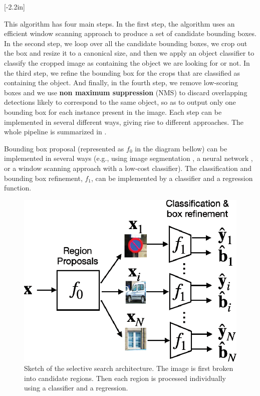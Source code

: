 [-2.2in]

This algorithm has four main steps. In the first step, the algorithm uses an efficient window scanning approach to produce a set of candidate bounding boxes. In the second step, we loop over all the candidate bounding boxes, we crop out the box and resize it to a canonical size, and then we apply an object classifier to classify the cropped image as containing the object we are looking for or not. In the third step, we refine the bounding box for the crops that are classified as containing the object. And finally, in the fourth step, we remove low-scoring boxes and we use {\bf non maximum suppression} (NMS) to discard overlapping detections likely to correspond to the same object, so as to output only one bounding box for each instance present in the image. Each step can be implemented in several different ways, giving rise to different approaches. The whole pipeline is summarized in \fig{\ref{fig:selective_search_pipeline}}.

Bounding box proposal (represented as $f_0$ in the diagram bellow) can be implemented in several ways (e.g., using image segmentation \cite{Uijlings2013}, a neural network \cite{Ren2015}, or a window scanning approach with a low-cost classifier). The classification and bounding box refinement, $f_1$, can be implemented by a classifier and a regression function.
\begin{figure}
\centerline{
\includegraphics[width=.4\linewidth]{figures/object_recognition/selective_search_architecture.eps}
}
\caption{Sketch of the selective search architecture. The image is first broken into candidate regions. Then each region is processed individually using a classifier and a regression.}
\end{figure}


